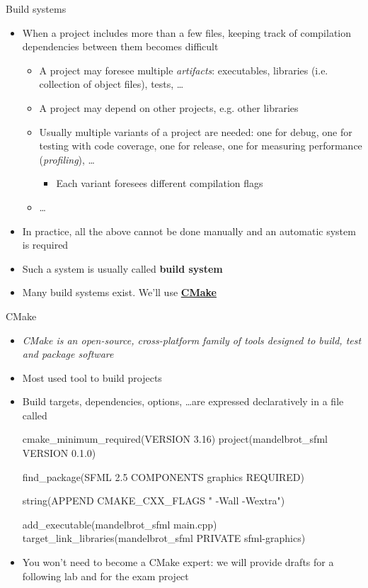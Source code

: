 \begin{frame}{Build systems}

  \begin{itemize}[<+->]
  \item When a project includes more than a few files, keeping track of
    compilation dependencies between them becomes difficult
    \begin{itemize}[<.->]
    \item A project may foresee multiple \textit{artifacts}: executables,
    libraries (i.e. collection of object files), tests, \ldots
    \item A project may depend on other projects, e.g. other libraries
    \item Usually multiple variants of a project are needed: one for debug,
    one for testing with code coverage, one for release, one for measuring
    performance (\textit{profiling}), \ldots
      \begin{itemize}[<.->]
      \item Each variant foresees different compilation flags
      \end{itemize}
    \item \ldots
    \end{itemize}
  \item In practice, all the above cannot be done manually and an automatic
    system is required
  \item Such a system is usually called \textbf{build system}
  \item Many build systems exist. We'll use
    \href{https://cmake.org}{\textbf{CMake}}
  \end{itemize}

\end{frame}

\begin{frame}[fragile]{CMake}
  \begin{itemize}[<+->]
  \item \textit{CMake is an open-source, cross-platform family of tools designed
      to build, test and package software}
  \item Most used tool to build \Cpp{} projects
  \item Build targets, dependencies, options, \ldots are expressed declaratively
    in a file called 
    \begin{codeblock}{
cmake_minimum_required(VERSION 3.16)
project(mandelbrot_sfml VERSION 0.1.0)

find_package(SFML 2.5 COMPONENTS graphics REQUIRED)

string(APPEND CMAKE_CXX_FLAGS " -Wall -Wextra")

add_executable(mandelbrot_sfml main.cpp)
target_link_libraries(mandelbrot_sfml PRIVATE sfml-graphics)
}\end{codeblock}
  \item You won't need to become a CMake expert: we will provide
   drafts for a following lab and for the exam project
\end{itemize}
\end{frame}

